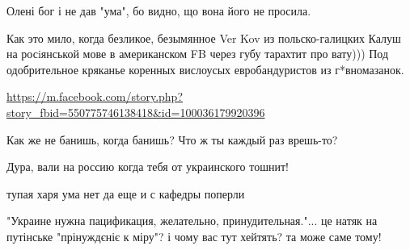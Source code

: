 \begin{itemize}
\begin{itemize}
Олені бог і не дав "ума", бо видно, що вона його не просила.

\end{itemize}

 

Как это мило, когда безликое, безымянное Ver Kov из польско-галицких Калуш на
росiянськой мове в американском FB через губу тарахтит про вату))) Под
одобрительное кряканье коренных вислоусых евробандуристов из г*вномазанок.


 
\url{https://m.facebook.com/story.php?story_fbid=550775746138418&id=100036179920396}

 
Как же не банишь, когда банишь? Что ж ты каждый раз врешь-то?

 
Дура, вали на россию когда тебя от украинского тошнит!

 
тупая харя ума нет да еще и с кафедры поперли

 
"Украине нужна пацификация, желательно, принудительная."... це натяк на
путінське "прінуждєніє к міру"? і чому вас тут хейтять? та може саме тому!

\end{itemize}

